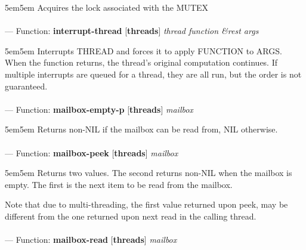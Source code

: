 \begin{adjustwidth}{5em}{5em}
Acquires the lock associated with the MUTEX
\end{adjustwidth}

\paragraph{}
\label{THREADS:INTERRUPT-THREAD}
--- Function: \textbf{interrupt-thread} [\textbf{threads}] \textit{thread function \&rest args}

\begin{adjustwidth}{5em}{5em}
Interrupts THREAD and forces it to apply FUNCTION to ARGS.
When the function returns, the thread's original computation continues. If  multiple interrupts are queued for a thread, they are all run, but the order is not guaranteed.
\end{adjustwidth}

\paragraph{}
\label{THREADS:MAILBOX-EMPTY-P}
--- Function: \textbf{mailbox-empty-p} [\textbf{threads}] \textit{mailbox}

\begin{adjustwidth}{5em}{5em}
Returns non-NIL if the mailbox can be read from, NIL otherwise.
\end{adjustwidth}

\paragraph{}
\label{THREADS:MAILBOX-PEEK}
--- Function: \textbf{mailbox-peek} [\textbf{threads}] \textit{mailbox}

\begin{adjustwidth}{5em}{5em}
Returns two values. The second returns non-NIL when the mailbox
is empty. The first is the next item to be read from the mailbox.

Note that due to multi-threading, the first value returned upon
peek, may be different from the one returned upon next read in the
calling thread.
\end{adjustwidth}

\paragraph{}
\label{THREADS:MAILBOX-READ}
--- Function: \textbf{mailbox-read} [\textbf{threads}] \textit{mailbox}

